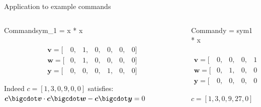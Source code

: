 \documentclass[handouts]{beamer}
\begin{document}
\begin{frame}{Application to example commands}   
    \begin{columns}[T] %
    \begin{column}{.48\textwidth}
        \begin{block}{Command}sym_1 = x * x\end{block} \pause
        
        \begin{align*}        
             [ &one,&x,&out,&sym_1,&y,&sym_2 ]\\
             \bm{v} = [&0,&1,&0,&0,&0,&0]  \\
             \bm{w} = [&0,&1,&0,&0,&0,&0]  \\
             \bm{y} = [&0,&0,&0,&1,&0,&0] 
        \end{align*}
        
        Indeed $c = [1,3,0,9,0,0]$ satisfies: $\bm{c} \bigcdot \bm{v} \cdot \bm{c} \bigcdot \bm{w} - \bm{c} \bigcdot \bm{y} = 0$   
    \end{column}%
    \hfill%
    \begin{column}{.48\textwidth}
        \begin{block}{Command}y = sym1 * x\end{block} \pause
        
        \begin{align*}        
              [ &one,&x,&out,&sym_1,&y,&sym_2 ]\\
             \bm{v} = [&0,&0,&0,&1,&0,&0]  \\
             \bm{w} = [&0,&1,&0,&0,&0,&0]  \\
             \bm{y} = [&0,&0,&0,&0,&1,&0] 
        \end{align*}    

        $c = [1,3,0,9,27,0]$
\end{column}%
\end{columns} 
\end{frame}
\end{document}
